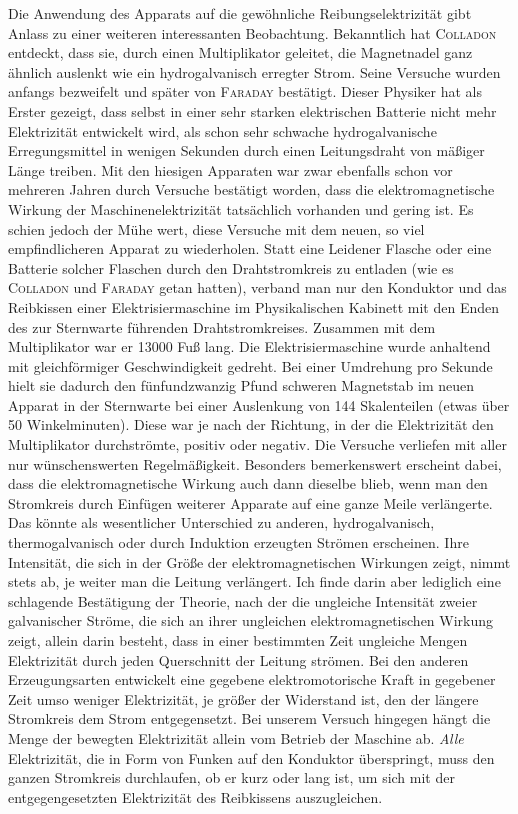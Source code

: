Die Anwendung des Apparats auf die gewöhnliche Reibungselektrizität gibt Anlass zu einer weiteren interessanten Beobachtung. Bekanntlich hat \textsc{Colladon} entdeckt, dass sie, durch einen Multiplikator geleitet, die Magnetnadel ganz ähnlich auslenkt wie ein hydrogalvanisch erregter Strom. Seine Versuche wurden anfangs bezweifelt und später von \textsc{Faraday} bestätigt. Dieser Physiker hat als Erster gezeigt, dass selbst in einer sehr starken elektrischen Batterie nicht mehr Elektrizität entwickelt wird, als schon sehr schwache hydrogalvanische Erregungsmittel in wenigen Sekunden durch einen Leitungsdraht von mäßiger Länge treiben. Mit den hiesigen Apparaten war zwar ebenfalls schon vor mehreren Jahren durch Versuche bestätigt worden, dass die elektromagnetische Wirkung der Maschinenelektrizität tatsächlich vorhanden und gering ist. Es schien jedoch der Mühe wert, diese Versuche mit dem neuen, so viel empfindlicheren Apparat zu wiederholen. Statt eine Leidener Flasche oder eine Batterie solcher Flaschen durch den Drahtstromkreis zu entladen (wie es \textsc{Colladon} und \textsc{Faraday} getan hatten), verband man nur den Konduktor und das Reibkissen einer Elektrisiermaschine im Physikalischen Kabinett mit den Enden des zur Sternwarte führenden Drahtstromkreises. Zusammen mit dem Multiplikator war er 13000 Fuß lang. Die Elektrisiermaschine wurde anhaltend mit gleichförmiger Geschwindigkeit gedreht. Bei einer Umdrehung pro Sekunde hielt sie dadurch den fünfundzwanzig Pfund schweren Magnetstab im neuen Apparat in der Sternwarte bei einer Auslenkung von 144 Skalenteilen (etwas über 50 Winkelminuten). Diese war je nach der Richtung, in der die Elektrizität den Multiplikator durchströmte, positiv oder negativ. Die Versuche verliefen mit aller nur wünschenswerten Regelmäßigkeit. Besonders bemerkenswert erscheint dabei, dass die elektromagnetische Wirkung auch dann dieselbe blieb, wenn man den Stromkreis durch Einfügen weiterer Apparate auf eine ganze Meile verlängerte. Das könnte als wesentlicher Unterschied zu anderen, hydrogalvanisch, thermogalvanisch oder durch Induktion erzeugten Strömen erscheinen. Ihre Intensität, die sich in der Größe der elektromagnetischen Wirkungen zeigt, nimmt stets ab, je weiter man die Leitung verlängert. Ich finde darin aber lediglich eine schlagende Bestätigung der Theorie, nach der die ungleiche Intensität zweier galvanischer Ströme, die sich an ihrer ungleichen elektromagnetischen Wirkung zeigt, allein darin besteht, dass in einer bestimmten Zeit ungleiche Mengen Elektrizität durch jeden Querschnitt der Leitung strömen.
Bei den anderen Erzeugungsarten entwickelt eine gegebene elektromotorische Kraft in gegebener Zeit umso weniger Elektrizität, je größer der Widerstand ist, den der längere Stromkreis dem Strom entgegensetzt. Bei unserem Versuch hingegen hängt die Menge der bewegten Elektrizität allein vom Betrieb der Maschine ab. \textit{Alle} Elektrizität, die in Form von Funken auf den Konduktor überspringt, muss den ganzen Stromkreis durchlaufen, ob er kurz oder lang ist, um sich mit der entgegengesetzten Elektrizität des Reibkissens auszugleichen.

